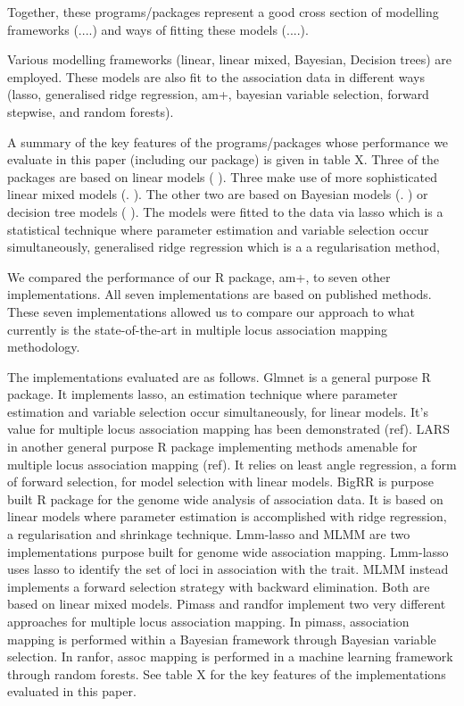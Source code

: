 \documentclass{article}
\begin{document}
Together, these programs/packages represent a good cross section of modelling frameworks (....) and ways of fitting these models (....). 




Various modelling frameworks (linear, linear mixed, Bayesian, Decision trees) are employed. These models are also fit to the association data in different ways (lasso, generalised ridge regression, am+, bayesian variable selection, forward stepwise, and random forests).  

A summary of the key features of the programs/packages whose performance we evaluate in this paper (including our package) is given in table X.  Three of the packages are based on linear models ( ). Three make use of  more sophisticated linear mixed models (. ).  The other two are based on Bayesian models (. ) or decision tree models ( ).   The models were fitted to the data via lasso which is a statistical technique where parameter estimation and variable selection occur simultaneously, generalised ridge regression which is a a regularisation method, 


We compared  the performance of our R package, am+,  to seven other implementations. All seven implementations are based on published methods. These seven implementations allowed us to compare our approach to what currently is the state-of-the-art in multiple locus association mapping methodology. 

The implementations evaluated are as follows. Glmnet is a general purpose R package. It implements lasso, an estimation technique where parameter estimation and variable selection occur simultaneously, for linear models. It's value for multiple locus association mapping has been demonstrated (ref). LARS in another general purpose R package implementing methods amenable for  multiple locus association mapping (ref). It relies on least angle regression, a form of forward selection, for model selection with linear models. BigRR is purpose built R package for the genome wide analysis of association data. It is based on linear models where parameter estimation is accomplished with ridge regression, a regularisation and shrinkage technique. Lmm-lasso and MLMM are two implementations purpose built for genome wide association mapping. Lmm-lasso uses lasso to identify the set of loci in association with the trait. MLMM instead implements a forward selection strategy with backward elimination. Both are based on linear mixed models. Pimass and randfor implement two very different approaches for multiple locus association mapping. In pimass, association mapping is performed within a Bayesian framework through Bayesian variable selection.  In ranfor, assoc mapping is performed in a machine learning framework through random forests. See table X for the  key features of the implementations evaluated in this paper.
\end{document}
